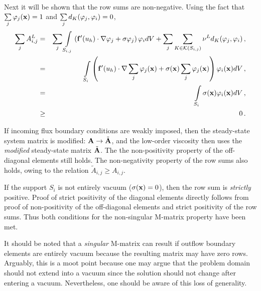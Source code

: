 \begin{prf}
\begin{eqnarray*}
\end{eqnarray*}
Next it will be shown that the row sums are non-negative.
Using the fact that $\sum\limits_j\varphi_j(\mathbf{x})=1$ and
$\sum\limits_j d_K(\varphi_j,\varphi_i)=0$,
\begin{eqnarray*}
   \sum\limits_j A^L_{i,j} & = & \sum\limits_j \int\limits_{S_{i,j}}
      \left(\mathbf{f}'(u_h)
        \cdot\nabla\varphi_j +
      \sigma\varphi_j\right)\varphi_i dV +
      \sum\limits_j\sum\limits_{K\in\mathcal{K}(S_{i,j})}\nu^L
        d_K(\varphi_j,\varphi_i)
      \,,\\
   & = & \int\limits_{S_i}\left(
      \mathbf{f}'(u_h)\cdot
      \nabla\sum\limits_j\varphi_j(\mathbf{x}) +
      \sigma(\mathbf{x})\sum\limits_j\varphi_j(\mathbf{x})\right)
      \varphi_i(\mathbf{x}) dV \,,\\
   \label{eq:rowsum} & = & \int\limits_{S_i}\sigma(\mathbf{x})\varphi_i(\mathbf{x}) dV
     \,,\\
   & \ge & 0 \,.
\end{eqnarray*}
\begin{rmk}
  If incoming flux boundary conditions are weakly imposed, then the steady-state
  system matrix is modified: $\mathbf{A}\rightarrow\tilde{\mathbf{A}}$, and the low-order
  viscosity then uses the \emph{modified} steady-state matrix $\tilde{\mathbf{A}}$.
  The the non-positivity property of the off-diagonal elements still holds.
  The non-negativity property of the row sums also holds, owing to the relation
  $\tilde{A}_{i,j} \geq A_{i,j}$.
\end{rmk}
If the support $S_i$ is not entirely vacuum ($\sigma(\mathbf{x})=0$), then the
row sum is \emph{strictly} positive.
Proof of strict positivity of the diagonal elements directly follows from proof
of non-positivity of the off-diagonal elements and strict positivity of the
row sums. Thus both conditions for the non-singular M-matrix property have
been met.
\begin{rmk}
It should be noted that a \emph{singular} M-matrix
can result if outflow boundary elements are entirely vacuum because the
resulting matrix may have zero rows. Arguably, this is a moot point because
one may argue that the problem domain should not extend into a vacuum since
the solution should not change after entering a vacuum. Nevertheless, one
should be aware of this loss of generality.
\end{rmk}

\end{prf}
